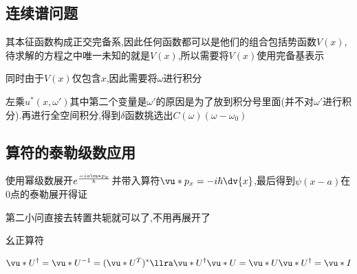         \subsection{连续谱问题}
            其本征函数构成正交完备系,因此任何函数都可以是他们的组合包括势函数$V(x)$,待求解的方程之中唯一未知的就是$V(x)$,所以需要将$V(x)$使用完备基表示
            
            同时由于$V(x)$仅包含$x$,因此需要将$\omega$进行积分

            左乘$u^{*}(x,\omega')$其中第二个变量是$\omega'$的原因是为了放到积分号里面(并不对$\omega'$进行积分).再进行全空间积分,得到$\delta$函数挑选出$C(\omega)(\omega-\omega_{0})$

        \subsection{算符的泰勒级数应用}
            使用幂级数展开$e^{\frac{-ia\vu*{p}_{x}}{\hbar}}$并带入算符$\vu*{p}_{x} = - i \hbar \dv{x}$,最后得到$\psi(x-a)$在$0$点的泰勒展开得证

            第二小问直接去转置共轭就可以了,不用再展开了
            \begin{formal}
                幺正算符

                $$  \vu*{U}^{\dagger} = \vu*{U}^{-1} = (\vu*{U}^{T})^{*} \llra \vu*{U}^{\dagger} \vu*{U} = \vu*{U} \vu*{U}^{\dagger}  = \vu*{I} $$
            \end{formal}

